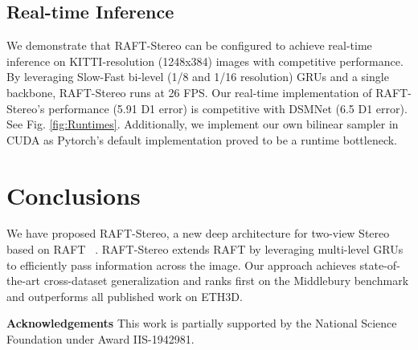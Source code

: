 \documentclass[10pt,twocolumn,letterpaper]{article}
\begin{document}
\subsection{Real-time Inference}
\label{sec:realtimeinf}
We demonstrate that RAFT-Stereo can be configured to achieve real-time inference on KITTI-resolution (1248x384) images with competitive performance. By leveraging Slow-Fast bi-level (1/8 and 1/16 resolution) GRUs and a single backbone, RAFT-Stereo runs at 26 FPS. Our real-time implementation of RAFT-Stereo's performance (5.91 D1 error) is competitive with DSMNet \cite{dsmnet} (6.5 D1 error). See Fig. \ref{fig:Runtimes}. Additionally, we implement our own bilinear sampler in CUDA as Pytorch's default implementation proved to be a runtime bottleneck. \section{Conclusions}
We have proposed RAFT-Stereo, a new deep architecture for two-view Stereo based on RAFT ~\cite{teed2020raft}. RAFT-Stereo extends RAFT by leveraging multi-level GRUs to efficiently pass information across the image. Our approach achieves state-of-the-art cross-dataset generalization and ranks first on the Middlebury benchmark and outperforms all published work on ETH3D.

\noindent \textbf{Acknowledgements} This work is partially supported by the National Science Foundation under Award IIS-1942981.




{\small


}
\end{document}
